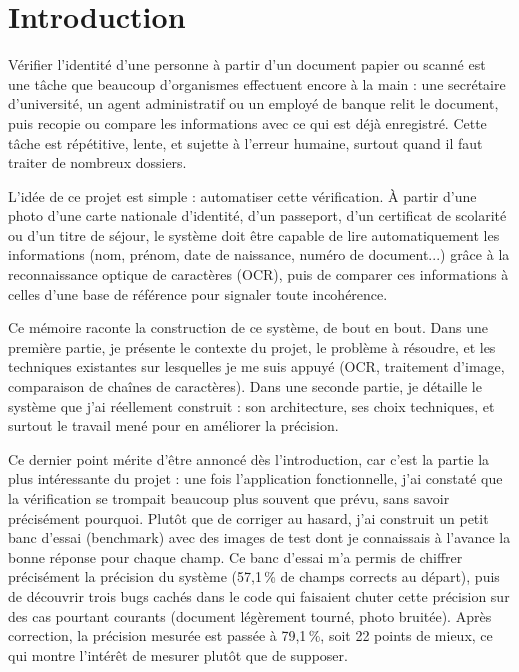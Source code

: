 \chapter*{Introduction}

Vérifier l'identité d'une personne à partir d'un document papier ou scanné est une tâche que beaucoup d'organismes effectuent encore à la main : une secrétaire d'université, un agent administratif ou un employé de banque relit le document, puis recopie ou compare les informations avec ce qui est déjà enregistré. Cette tâche est répétitive, lente, et sujette à l'erreur humaine, surtout quand il faut traiter de nombreux dossiers.

L'idée de ce projet est simple : automatiser cette vérification. À partir d'une photo d'une carte nationale d'identité, d'un passeport, d'un certificat de scolarité ou d'un titre de séjour, le système doit être capable de lire automatiquement les informations (nom, prénom, date de naissance, numéro de document...) grâce à la reconnaissance optique de caractères (OCR), puis de comparer ces informations à celles d'une base de référence pour signaler toute incohérence.

Ce mémoire raconte la construction de ce système, de bout en bout. Dans une première partie, je présente le contexte du projet, le problème à résoudre, et les techniques existantes sur lesquelles je me suis appuyé (OCR, traitement d'image, comparaison de chaînes de caractères). Dans une seconde partie, je détaille le système que j'ai réellement construit : son architecture, ses choix techniques, et surtout le travail mené pour en améliorer la précision.

Ce dernier point mérite d'être annoncé dès l'introduction, car c'est la partie la plus intéressante du projet : une fois l'application fonctionnelle, j'ai constaté que la vérification se trompait beaucoup plus souvent que prévu, sans savoir précisément pourquoi. Plutôt que de corriger au hasard, j'ai construit un petit banc d'essai (benchmark) avec des images de test dont je connaissais à l'avance la bonne réponse pour chaque champ. Ce banc d'essai m'a permis de chiffrer précisément la précision du système (57,1\,\% de champs corrects au départ), puis de découvrir trois bugs cachés dans le code qui faisaient chuter cette précision sur des cas pourtant courants (document légèrement tourné, photo bruitée). Après correction, la précision mesurée est passée à 79,1\,\%, soit 22 points de mieux, ce qui montre l'intérêt de mesurer plutôt que de supposer.
